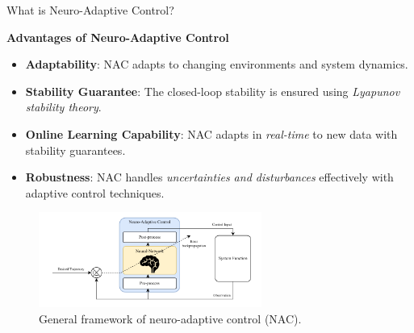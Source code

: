 \documentclass[8pt, aspectratio=169, handout]{beamer}
\begin{document}
\begin{frame}{\insertsubsectionhead}{What is Neuro-Adaptive Control?}

  \textbf{Advantages of Neuro-Adaptive Control}
  \small{
    \begin{itemize}
      \item <+-> \textbf{Adaptability}: NAC adapts to changing environments and system dynamics.
      \item <+-> \textbf{Stability Guarantee}: The closed-loop stability is ensured using \textit{Lyapunov stability theory}.
      \item <+-> \textbf{Online Learning Capability}: NAC adapts in \textit{real-time} to new data with stability guarantees.
      \item <+-> \textbf{Robustness}: NAC handles \textit{uncertainties and disturbances} effectively with adaptive control techniques.
    \end{itemize}
  }
  
\begin{figure}
  \label{fig:general_framework}
  \includegraphics[width=0.65\textwidth]{figures/conv_nac.drawio.pdf}
  \caption{General framework of neuro-adaptive control (NAC).}
\end{figure}

\end{frame}
\end{document}
